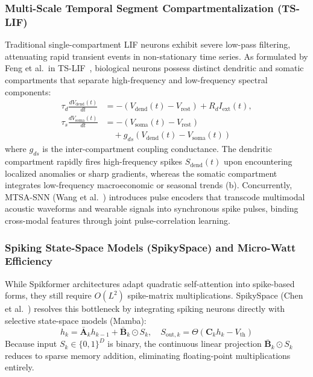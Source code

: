 \subsubsection{Multi-Scale Temporal Segment Compartmentalization (TS-LIF)}
Traditional single-compartment LIF neurons exhibit severe low-pass filtering, attenuating rapid transient events in non-stationary time series. As formulated by Feng et al.\ in TS-LIF~\cite{Feng2025TSLIF}, biological neurons possess distinct dendritic and somatic compartments that separate high-frequency and low-frequency spectral components:
\begin{align}
    \tau_d \frac{d V_{\text{dend}}(t)}{dt} &= -\left(V_{\text{dend}}(t) - V_{\text{rest}}\right) + R_d I_{\text{ext}}(t), \\
    \tau_s \frac{d V_{\text{soma}}(t)}{dt} &= -\left(V_{\text{soma}}(t) - V_{\text{rest}}\right) \nonumber \\
    &\quad + g_{ds} \left(V_{\text{dend}}(t) - V_{\text{soma}}(t)\right)
\end{align}
where $g_{ds}$ is the inter-compartment coupling conductance. The dendritic compartment rapidly fires high-frequency spikes $S_{\text{dend}}(t)$ upon encountering localized anomalies or sharp gradients, whereas the somatic compartment integrates low-frequency macroeconomic or seasonal trends (b). Concurrently, MTSA-SNN (Wang et al.~\cite{Wang2024MTSASNN}) introduces pulse encoders that transcode multimodal acoustic waveforms and wearable signals into synchronous spike pulses, binding cross-modal features through joint pulse-correlation learning.

\subsubsection{Spiking State-Space Models (SpikySpace) and Micro-Watt Efficiency}
While Spikformer architectures adapt quadratic self-attention into spike-based forms, they still require $O(L^2)$ spike-matrix multiplications. SpikySpace (Chen et al.~\cite{Chen2026SpikySpace}) resolves this bottleneck by integrating spiking neurons directly with selective state-space models (Mamba):
\begin{equation}
    h_k = \bar{\mathbf{A}}_k h_{k-1} + \bar{\mathbf{B}}_k \odot S_k, \quad S_{\text{out}, k} = \Theta\left(\mathbf{C}_k h_k - V_{\text{th}}\right)
\end{equation}
Because input $S_k \in \{0, 1\}^D$ is binary, the continuous linear projection $\bar{\mathbf{B}}_k \odot S_k$ reduces to sparse memory addition, eliminating floating-point multiplications entirely.

